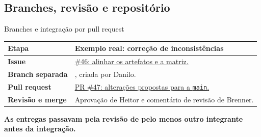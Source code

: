 \documentclass[aspectratio=169,t,xcolor=table]{beamer}
\newcommand{\head}[1]{\textcolor{UFGBlue}{\textbf{#1}}}
\begin{document}
\subsection{Branches, revisão e repositório}
\begin{frame}{Branches e integração por pull request}

\small
\begin{tabularx}{\textwidth}{@{}L{.22\textwidth}Y@{}}
\toprule\head{Etapa} & \head{Exemplo real: correção de inconsistências}\\\midrule
\textbf{Issue} & \href{https://github.com/EnzoMachad0/projeto-dominios/issues/46}{\#46: alinhar os artefatos e a matriz.}\\[.13cm]
\textbf{Branch separada} & , criada por Danilo.\\[.13cm]
\textbf{Pull request} & \href{https://github.com/EnzoMachad0/projeto-dominios/pull/47}{PR \#47: alterações propostas para a \texttt{main}.}\\[.13cm]
\textbf{Revisão e merge} & Aprovação de Heitor e comentário de revisão de Brenner.\\\bottomrule
\end{tabularx}\par
\vspace{.25cm}\vspace{.3cm}
\textbf{As entregas passavam pela revisão de pelo menos outro integrante antes da integração.}

\end{frame}
\end{document}
